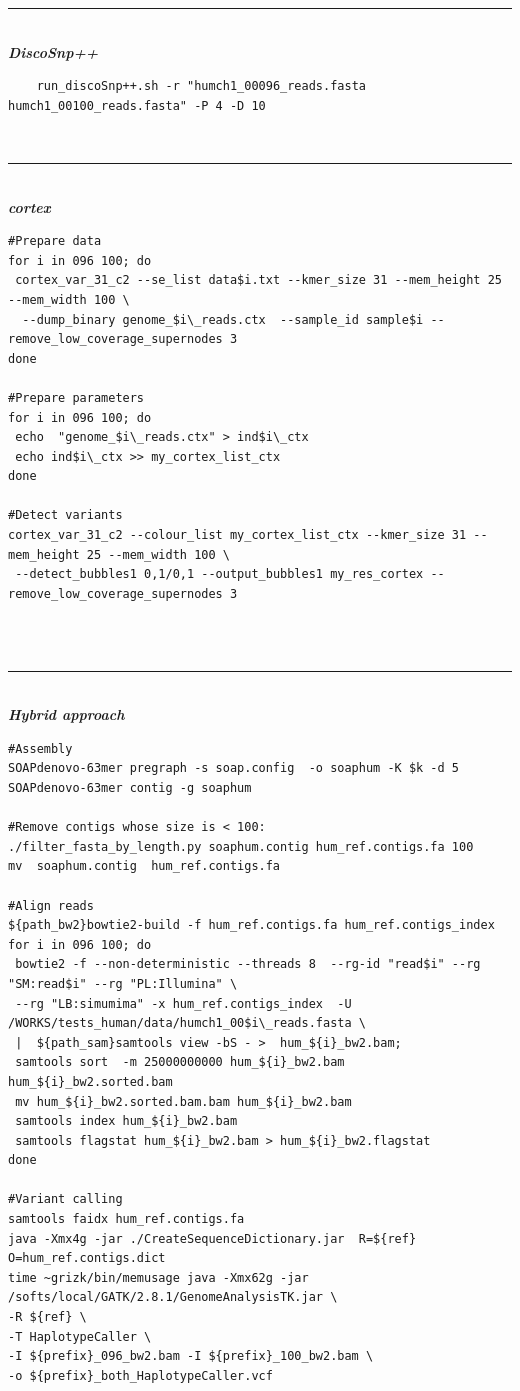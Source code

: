 \documentclass{bmcart}
\newcommand{\discopp}{{\it DiscoSnp++}\xspace}
\newcommand{\co}{{\it cortex}\xspace}
\begin{document}
\begin{table}[ht]
	\hrule~\\
\emph\textbf{{\discopp}}
	\scriptsize\begin{verbatim}
	run_discoSnp++.sh -r "humch1_00096_reads.fasta humch1_00100_reads.fasta" -P 4 -D 10
	\end{verbatim}	\normalsize
~\hrule~\\
\emph\textbf{{\co}}
\scriptsize\begin{verbatim}
#Prepare data
for i in 096 100; do
 cortex_var_31_c2 --se_list data$i.txt --kmer_size 31 --mem_height 25 --mem_width 100 \
  --dump_binary genome_$i\_reads.ctx  --sample_id sample$i --remove_low_coverage_supernodes 3
done

#Prepare parameters
for i in 096 100; do
 echo  "genome_$i\_reads.ctx" > ind$i\_ctx
 echo ind$i\_ctx >> my_cortex_list_ctx
done

#Detect variants
cortex_var_31_c2 --colour_list my_cortex_list_ctx --kmer_size 31 --mem_height 25 --mem_width 100 \
 --detect_bubbles1 0,1/0,1 --output_bubbles1 my_res_cortex --remove_low_coverage_supernodes 3 
 
	\end{verbatim}	\normalsize
~\hrule~\\
\emph\textbf{Hybrid approach}
\scriptsize\begin{verbatim}
#Assembly
SOAPdenovo-63mer pregraph -s soap.config  -o soaphum -K $k -d 5 
SOAPdenovo-63mer contig -g soaphum

#Remove contigs whose size is < 100:
./filter_fasta_by_length.py soaphum.contig hum_ref.contigs.fa 100
mv  soaphum.contig  hum_ref.contigs.fa

#Align reads
${path_bw2}bowtie2-build -f hum_ref.contigs.fa hum_ref.contigs_index 
for i in 096 100; do
 bowtie2 -f --non-deterministic --threads 8  --rg-id "read$i" --rg "SM:read$i" --rg "PL:Illumina" \ 
 --rg "LB:simumima" -x hum_ref.contigs_index  -U /WORKS/tests_human/data/humch1_00$i\_reads.fasta \ 
 |  ${path_sam}samtools view -bS - >  hum_${i}_bw2.bam;
 samtools sort  -m 25000000000 hum_${i}_bw2.bam hum_${i}_bw2.sorted.bam
 mv hum_${i}_bw2.sorted.bam.bam hum_${i}_bw2.bam
 samtools index hum_${i}_bw2.bam
 samtools flagstat hum_${i}_bw2.bam > hum_${i}_bw2.flagstat
done

#Variant calling
samtools faidx hum_ref.contigs.fa
java -Xmx4g -jar ./CreateSequenceDictionary.jar  R=${ref}  O=hum_ref.contigs.dict
time ~grizk/bin/memusage java -Xmx62g -jar /softs/local/GATK/2.8.1/GenomeAnalysisTK.jar \
-R ${ref} \
-T HaplotypeCaller \
-I ${prefix}_096_bw2.bam -I ${prefix}_100_bw2.bam \
-o ${prefix}_both_HaplotypeCaller.vcf
	\end{verbatim}	\normalsize
	\caption{Commands used for calling SNPs and indels from two human chromosome 1 read sets (humch1\_00096\_reads.fasta humch1\_00100\_reads.fasta) with \discopp, \co or the hybrid approach. \label{tab:humancommands}}
\end{table}
\end{document}
